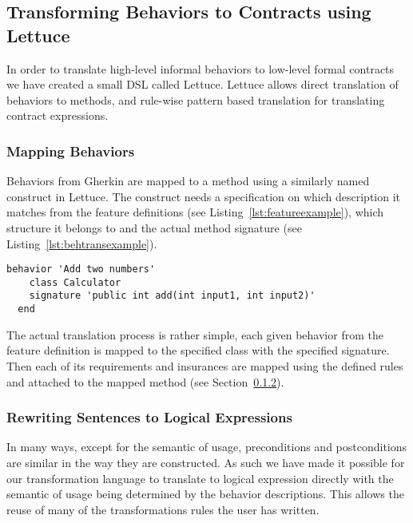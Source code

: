 \subsection{Transforming Behaviors to Contracts using Lettuce}
\label{sub:Transforming Behaviors to Contracts using Lettuce}

In order to translate high-level informal behaviors to low-level formal
contracts we have created a small DSL called Lettuce.
Lettuce allows direct translation of behaviors to methods,
and rule-wise pattern based translation for translating contract expressions.

\subsubsection{Mapping Behaviors}
\label{sub:Mapping Behaviors}

Behaviors from Gherkin are mapped to a method using a similarly named
construct in Lettuce. The construct needs a specification on which
description it matches from the feature definitions (see Listing~\ref{lst:featureexample}),
which structure it belongs to and the actual method signature
(see Listing~\ref{lst:behtransexample}).

\begin{lstlisting}[caption={General Behavior Description of Adding Natural Numbers},label={lst:behtransexample}]
  behavior 'Add two numbers'
    class Calculator
    signature 'public int add(int input1, int input2)'
  end
\end{lstlisting}

The actual translation process is rather simple,
each given behavior from the feature definition is mapped to the
specified class with the specified signature. Then each of its requirements
and insurances are mapped using the defined rules and attached to the mapped
method (see Section~\ref{sub:RewritingSentencestoLogicalExpressions}).

\subsubsection{Rewriting Sentences to Logical Expressions}
\label{sub:RewritingSentencestoLogicalExpressions}

In many ways, except for the semantic of usage,
preconditions and postconditions are similar in the way they are constructed.
As such we have made it possible for our transformation language to translate
to logical expression directly with the semantic of usage being determined by
the behavior descriptions. 
This allows the reuse of many of the transformations rules the user has written.


